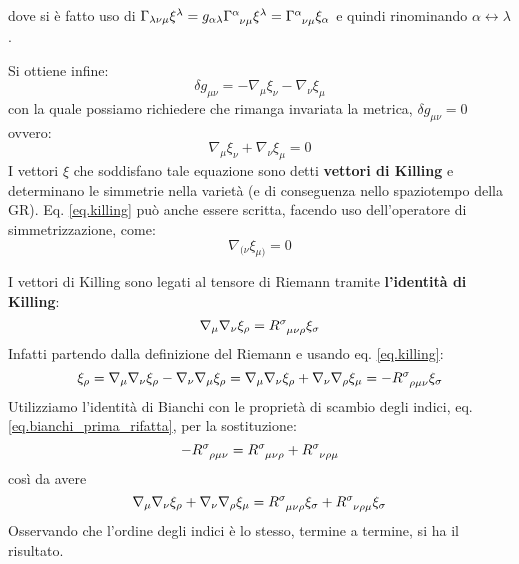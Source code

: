 dove si è fatto uso di $\Gamma_{\lambda\nu\mu}\xi^\lambda = g_{\alpha\lambda}\tensor{\Gamma}{^\alpha_{\nu\mu}}\xi^\lambda= \tensor{\Gamma}{^\alpha_{\nu\mu}}\xi_\alpha$ e quindi rinominando $\alpha \leftrightarrow \lambda$.

    Si ottiene infine:
\begin{equation}
    \delta g_{\mu\nu} = - \nabla_\mu \xi_\nu - \nabla_\nu \xi_\mu
\end{equation}
con la quale possiamo richiedere che rimanga invariata la metrica, $\delta g_{\mu\nu} = 0$ ovvero:
\begin{equation}
    \nabla_\mu \xi_\nu + \nabla_\nu \xi_\mu = 0
    \label{eq.killing}
\end{equation}
I vettori $\xi$ che soddisfano tale equazione sono detti \textbf{vettori di Killing} e determinano le simmetrie nella varietà (e di conseguenza nello spaziotempo della GR). Eq. \ref{eq.killing} può anche essere scritta, facendo uso dell'operatore di simmetrizzazione, come:
\begin{equation*}
    \nabla_{(\nu}\xi_{\mu)} = 0
\end{equation*}

I vettori di Killing sono legati al tensore di Riemann tramite \textbf{l'identità di Killing}:
\begin{equation}
    \nabla_\mu \nabla_\nu \xi_\rho = \tensor{R}{^\sigma_{\mu\nu\rho}}\xi_\sigma
    \label{eq.identità_killing}
\end{equation}
Infatti partendo dalla definizione del Riemann e usando eq. \ref{eq.killing}:
\begin{equation*}
    [\nabla_\mu,\nabla_\nu]\xi_\rho = \nabla_\mu\nabla_\nu\xi_\rho - \nabla_\nu\nabla_\mu\xi_\rho = \nabla_\mu\nabla_\nu\xi_\rho + \nabla_\nu\nabla_\rho\xi_\mu = - \tensor{R}{^\sigma_{\rho\mu\nu}}\xi_\sigma   
\end{equation*}
Utilizziamo l'identità di Bianchi con le proprietà di scambio degli indici, eq. \ref{eq.bianchi_prima_rifatta}, per la sostituzione:
\begin{equation*}
     - \tensor{R}{^\sigma_{\rho\mu\nu}} = \tensor{R}{^\sigma_{\mu\nu\rho}} + \tensor{R}{^\sigma_{\nu\rho\mu}}
\end{equation*}
così da avere
\begin{equation*}
    \nabla_\mu\nabla_\nu\xi_\rho + \nabla_\nu\nabla_\rho\xi_\mu =  \tensor{R}{^\sigma_{\mu\nu\rho}}\xi_\sigma + \tensor{R}{^\sigma_{\nu\rho\mu}}\xi_\sigma
\end{equation*}
Osservando che l'ordine degli indici è lo stesso, termine a termine, si ha il risultato.

